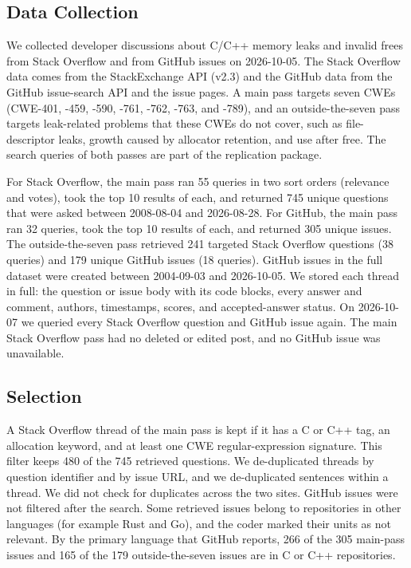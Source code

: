
\subsection{Data Collection}
We collected developer discussions about C/C++ memory leaks and invalid frees from Stack Overflow and from GitHub issues on 2026-10-05.
The Stack Overflow data comes from the StackExchange API (v2.3) and the GitHub data from the GitHub issue-search API and the issue pages.
A main pass targets seven CWEs (CWE-401, -459, -590, -761, -762, -763, and -789), and an outside-the-seven pass targets leak-related problems that these CWEs do not cover, such as file-descriptor leaks, growth caused by allocator retention, and use after free.
The search queries of both passes are part of the replication package.

For Stack Overflow, the main pass ran 55 queries in two sort orders (relevance and votes), took the top 10 results of each, and returned 745 unique questions that were asked between 2008-08-04 and 2026-08-28.
For GitHub, the main pass ran 32 queries, took the top 10 results of each, and returned 305 unique issues.
The outside-the-seven pass retrieved 241 targeted Stack Overflow questions (38 queries) and 179 unique GitHub issues (18 queries).
GitHub issues in the full dataset were created between 2004-09-03 and 2026-10-05.
We stored each thread in full: the question or issue body with its code blocks, every answer and comment, authors, timestamps, scores, and accepted-answer status.
On 2026-10-07 we queried every Stack Overflow question and GitHub issue again.
The main Stack Overflow pass had no deleted or edited post, and no GitHub issue was unavailable.

\subsection{Selection}
A Stack Overflow thread of the main pass is kept if it has a C or C++ tag, an allocation keyword, and at least one CWE regular-expression signature.
This filter keeps 480 of the 745 retrieved questions.
We de-duplicated threads by question identifier and by issue URL, and we de-duplicated sentences within a thread.
We did not check for duplicates across the two sites.
GitHub issues were not filtered after the search.
Some retrieved issues belong to repositories in other languages (for example Rust and Go), and the coder marked their units as not relevant.
By the primary language that GitHub reports, 266 of the 305 main-pass issues and 165 of the 179 outside-the-seven issues are in C or C++ repositories.

